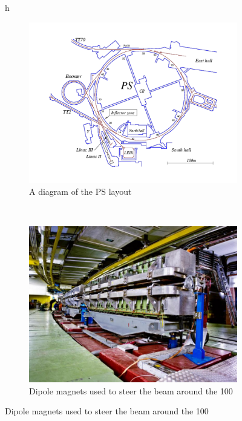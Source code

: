 \begin{figure}{h}
    \centering
    \begin{subfigure}[h]{0.45\textwidth}
        \includegraphics[width=\textwidth]{Figures/LHC_Diagrams/LHC__PS__pscomplex.pdf}
        \caption{A diagram of the PS layout}\label{fig:ps_layout}
      \end{subfigure}
      ~ %
    \begin{subfigure}[h]{0.45\textwidth}
        \includegraphics[width=\textwidth]{Figures/LHC_Diagrams/LHC__PS__Dipoles_accelerators-ps.jpg}
        \caption{Dipole magnets used to steer the beam around the 100
}
\end{subfigure}
\end{figure}
